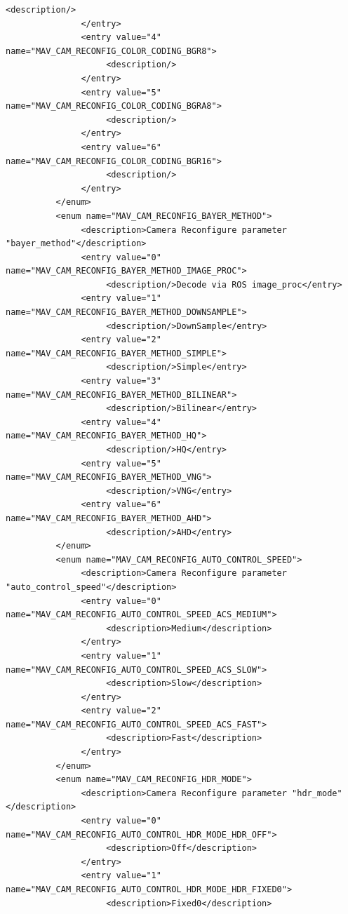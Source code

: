 \begin{lstlisting}[captionpos=b, caption="Definition of \textsc{Skye} specific Mavlink messages", label=app_xml]
                    <description/>
               </entry>
               <entry value="4" name="MAV_CAM_RECONFIG_COLOR_CODING_BGR8">
                    <description/>
               </entry>
               <entry value="5" name="MAV_CAM_RECONFIG_COLOR_CODING_BGRA8">
                    <description/>
               </entry>
               <entry value="6" name="MAV_CAM_RECONFIG_COLOR_CODING_BGR16">
                    <description/>
               </entry>
          </enum>
          <enum name="MAV_CAM_RECONFIG_BAYER_METHOD">
               <description>Camera Reconfigure parameter "bayer_method"</description>
               <entry value="0" name="MAV_CAM_RECONFIG_BAYER_METHOD_IMAGE_PROC">
                    <description/>Decode via ROS image_proc</entry>
               <entry value="1" name="MAV_CAM_RECONFIG_BAYER_METHOD_DOWNSAMPLE">
                    <description/>DownSample</entry>
               <entry value="2" name="MAV_CAM_RECONFIG_BAYER_METHOD_SIMPLE">
                    <description/>Simple</entry>
               <entry value="3" name="MAV_CAM_RECONFIG_BAYER_METHOD_BILINEAR">
                    <description/>Bilinear</entry>
               <entry value="4" name="MAV_CAM_RECONFIG_BAYER_METHOD_HQ">
                    <description/>HQ</entry>
               <entry value="5" name="MAV_CAM_RECONFIG_BAYER_METHOD_VNG">
                    <description/>VNG</entry>
               <entry value="6" name="MAV_CAM_RECONFIG_BAYER_METHOD_AHD">
                    <description/>AHD</entry>
          </enum>
          <enum name="MAV_CAM_RECONFIG_AUTO_CONTROL_SPEED">
               <description>Camera Reconfigure parameter "auto_control_speed"</description>
               <entry value="0" name="MAV_CAM_RECONFIG_AUTO_CONTROL_SPEED_ACS_MEDIUM">
                    <description>Medium</description>
               </entry>
               <entry value="1" name="MAV_CAM_RECONFIG_AUTO_CONTROL_SPEED_ACS_SLOW">
                    <description>Slow</description>
               </entry>
               <entry value="2" name="MAV_CAM_RECONFIG_AUTO_CONTROL_SPEED_ACS_FAST">
                    <description>Fast</description>
               </entry>
          </enum>
          <enum name="MAV_CAM_RECONFIG_HDR_MODE">
               <description>Camera Reconfigure parameter "hdr_mode"</description>
               <entry value="0" name="MAV_CAM_RECONFIG_AUTO_CONTROL_HDR_MODE_HDR_OFF">
                    <description>Off</description>
               </entry>
               <entry value="1" name="MAV_CAM_RECONFIG_AUTO_CONTROL_HDR_MODE_HDR_FIXED0">
                    <description>Fixed0</description>

\end{lstlisting}
